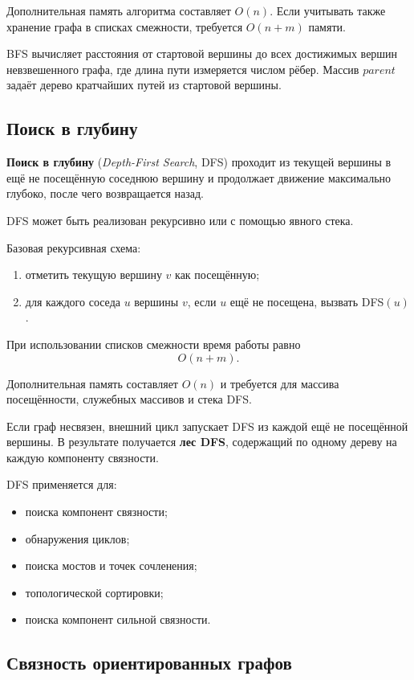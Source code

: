Дополнительная память алгоритма составляет $O(n)$. Если учитывать также хранение графа в списках смежности, требуется $O(n+m)$ памяти.

BFS вычисляет расстояния от стартовой вершины до всех достижимых вершин невзвешенного графа, где длина пути измеряется числом рёбер. Массив $parent$ задаёт дерево кратчайших путей из стартовой вершины.

\subsection{Поиск в глубину}

\textbf{Поиск в глубину} (\textit{Depth-First Search}, DFS) проходит из текущей вершины в ещё не посещённую соседнюю вершину и продолжает движение максимально глубоко, после чего возвращается назад.

DFS может быть реализован рекурсивно или с помощью явного стека.

Базовая рекурсивная схема:
\begin{enumerate}
	\item отметить текущую вершину $v$ как посещённую;
	\item для каждого соседа $u$ вершины $v$, если $u$ ещё не посещена, вызвать DFS$(u)$.
\end{enumerate}

При использовании списков смежности время работы равно
\[
O(n+m).
\]

Дополнительная память составляет $O(n)$ и требуется для массива посещённости, служебных массивов и стека DFS.

Если граф несвязен, внешний цикл запускает DFS из каждой ещё не посещённой вершины. В результате получается \textbf{лес DFS}, содержащий по одному дереву на каждую компоненту связности.

DFS применяется для:
\begin{itemize}
	\item поиска компонент связности;
	\item обнаружения циклов;
	\item поиска мостов и точек сочленения;
	\item топологической сортировки;
	\item поиска компонент сильной связности.
\end{itemize}


\subsection{Связность ориентированных графов}

